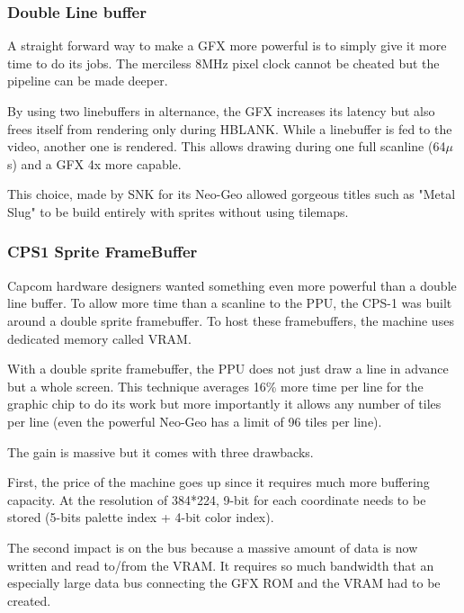 \subsubsection{Double Line buffer}
A straight forward way to make a GFX more powerful is to simply give it more time to do its jobs. The merciless 8MHz pixel clock cannot be cheated but the pipeline can be made deeper.

By using two linebuffers in alternance, the GFX increases its latency but also frees itself from rendering only during HBLANK. While a linebuffer is fed to the video, another one is rendered. This allows drawing during one full scanline (64$\mu$s) and a GFX 4x more capable. 

This choice, made by SNK for its Neo-Geo allowed gorgeous titles such as "Metal Slug" to be build entirely with sprites without using tilemaps.




\subsubsection{CPS1 Sprite FrameBuffer}
Capcom hardware designers wanted something even more powerful than a double line buffer. To allow more time than a scanline to the PPU, the CPS-1 was built around a double sprite framebuffer. To host these framebuffers, the machine uses dedicated memory called VRAM.

With a double sprite framebuffer, the PPU does not just draw a line in advance but a whole screen. This technique averages 16\% more time per line for the graphic chip to do its work but more importantly it allows any number of tiles per line (even the powerful Neo-Geo has a limit of 96 tiles per line).

The gain is massive but it comes with three drawbacks. 

First, the price of the machine goes up since it requires much more buffering capacity. At the resolution of 384*224, 9-bit for each coordinate needs to be stored (5-bits palette index + 4-bit color index).


The second impact is on the bus because a massive amount of data is now written and read to/from the VRAM. It requires so much bandwidth that an especially large data bus connecting the GFX ROM and the VRAM had to be created.

